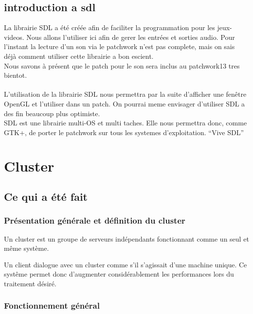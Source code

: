 \documentclass[14pt,a4paper]{report}
\begin{document}
\section{introduction a sdl}

La librairie SDL a \'et\'e cr\'e\'ee afin de faciliter la programmation
pour les jeux-videos.
Nous allons l'utiliser ici afin de gerer les entr\'ees et sorties audio.
 Pour l'instant la lecture d'un son via le patchwork n'est pas complete,
 mais on sais d\'ej\`a comment utiliser cette librairie a bon escient.
\\
Nous savons \`a pr\'esent que le patch pour le son sera
inclus au patchwork13 tres bientot.
\\
\\
L'utilisation de la librairie SDL nous permettra par la suite d'afficher
une fen\^etre OpenGL
et l'utiliser dans un patch.
On pourrai meme envisager d'utiliser SDL a des fin beaucoup plus optimiste.
\\
SDL est une librairie multi-OS et multi taches.
Elle nous permettra donc, comme GTK+, de 
porter le patchwork sur tous les systemes d'exploitation. ``Vive SDL''



\chapter{Cluster}

\section{Ce qui a \'et\'e fait}

\subsection{Pr\'esentation g\'en\'erale et d\'efinition du cluster}

Un cluster est un groupe de serveurs ind\'ependants fonctionnant comme un seul
et m\^eme syst\`eme.

Un client dialogue avec un cluster comme s'il s'agissait
d'une machine unique. Ce syst\^eme permet donc d'augmenter consid\'erablement
les performances lors du traitement d\'esir\'e. \\

\subsection{Fonctionnement g\'en\'eral}
\end{document}
